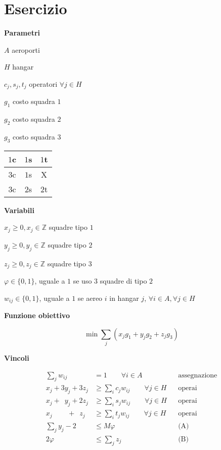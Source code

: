 \documentclass[10pt,a4paper,twoside,openright]{book}
\newcounter{es}
\newcommand{\Es}{
	\stepcounter{es}
	\section{Esercizio \arabic{es}}
	}
\numberwithin{es}{chapter}
\newcommand{\Par}{\textbf{Parametri}}
\newcommand{\Var}{\textbf{Variabili}}
\newcommand{\Fob}{\textbf{Funzione obiettivo}}
\newcommand{\Vin}{\textbf{Vincoli}}
\begin{document}
\Es

\Par

$A$ aeroporti

$H$ hangar

$c_{j},s_{j},t_{j}$ operatori $\forall j\in H$

$g_{1}$ costo squadra $1$

$g_{2}$ costo squadra $2$

$g_{3}$ costo squadra $3$

\begin{center}
	
	\begin{tabular}{|c|c|c|}
		\hline 
		$1$c & $1$s & $1$t \\
		\hline 
		$3$c & $1$s & X    \\
		\hline 
		$3$c & $2$s & $2$t \\
		\hline
	\end{tabular}
\end{center}

\Var

$x_{j} \geq 0,x_{j} \in \mathbb{Z}$ squadre tipo $1$

$y_{j} \geq 0,y_{j} \in \mathbb{Z}$ squadre tipo $2$

$z_{j} \geq 0,z_{j} \in \mathbb{Z}$ squadre tipo $3$

$\varphi \in \{0,1\}$, uguale a $1$ se uso 3 squadre di tipo $2$

$w_{ij} \in \{0,1\}$, uguale a $1$ se aereo $i$ in hangar $j$, $\forall i\in A,\forall j\in H$

\Fob

\begin{equation*}
	\min \sum _{j}( x_{j} g_{1} +y_{j} g_{2} +z_{j} g_{3})
\end{equation*}

\Vin

\begin{align*}
	\sum _{j} w_{ij} &=1\qquad\forall i\in A&&\text{assegnazione}\\
	x_{j} +3y_{j} +3z_{j} &\geq \sum _{i} c_{j} w_{ij} \qquad\forall j\in H &&\text{operai}\\
	x_{j} +\phantom{3}y_{j}  +2z_{j} &\geq \sum _{i} s_{j} w_{ij} \qquad\forall j\in H &&\text{operai}\\
	x_{j} \phantom{+3y_{j}}  +\phantom{2}z_{j}  &\geq \sum _{i} t_{j} w_{ij} \qquad\forall j\in H &&\text{operai}\\
	\sum _{j} y_{j} -2&\leq M\varphi &&\text{(A)}\\
	2\varphi &\leq \sum _{j} z_{j}&&\text{(B)}
\end{align*}
\end{document}
